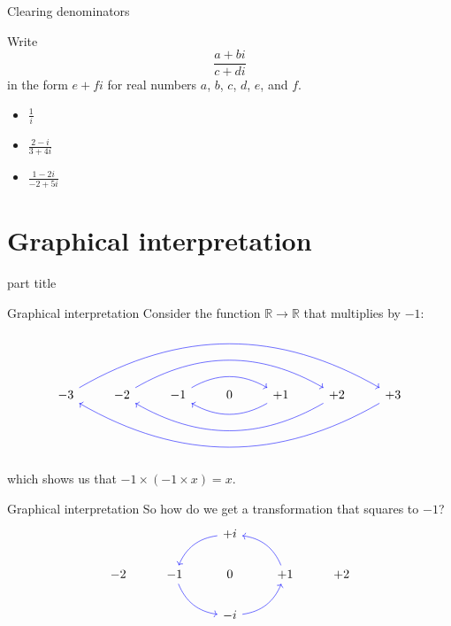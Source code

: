 \documentclass{beamer}
\begin{document}
\begin{frame}{Clearing denominators}
\begin{example}[Exemplar]
Write 
\begin{equation*}
\frac{a+bi}{c+di}
\end{equation*}
in the form $e+fi$ for real numbers $a$, $b$, $c$, $d$, $e$, and $f$.
\end{example}
\begin{itemize}
\item $\frac{1}{i}$ %
\item $\frac{2-i}{3+4i}$ %
\item $\frac{1-2i}{-2+5i}$ %
\end{itemize}
\end{frame}

\section{Graphical interpretation}

\begin{frame}
\begin{beamercolorbox}[sep=12pt,center]{part title}
\insertsection\par
\end{beamercolorbox}
\end{frame}

\begin{frame}[fragile]{Graphical interpretation}
Consider the function $\mathbb{R} \rightarrow \mathbb{R}$ that multiplies by $-1$:
\begin{equation*}
\begin{tikzcd}
-3\arrow[bend left, color = blue]{rrrrrr} & -2\arrow[bend left, color = blue]{rrrr} & -1 \arrow[bend left, color = blue]{rr} & 0 & +1\arrow[bend left, color = blue]{ll} & +2\arrow[bend left, color = blue]{llll} & +3\arrow[bend left, color = blue]{llllll}\\
\end{tikzcd}
\end{equation*}
which shows us that $-1\times(-1\times x) = x$.
\end{frame}

\begin{frame}[fragile]{Graphical interpretation}
So how do we get a transformation that squares to $-1$?
\begin{equation*}
\begin{tikzcd}
{} & {} & +i \arrow[bend right, color = blue]{dl} & {} & {}\\
-2 & -1\arrow[bend right, color = blue]{dr} & 0 & +1 \arrow[bend right, color = blue]{ul} & +2\\
{} & {} & -i\arrow[bend right, color = blue]{ur} & {} & {}
\end{tikzcd}
\end{equation*}
\end{frame}
\end{document}
